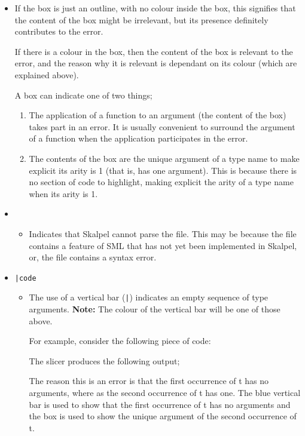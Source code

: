 \documentclass{report}
\begin{document}
\begin{itemize}
\item \texttt{}

\subitem If the box is just an outline, with no colour inside the box,
  this signifies that the content of the box might be irrelevant, but its
  presence definitely contributes to the error.

\subitem If there is a colour in the box, then the
  content of the box is relevant to the error, and the reason why it
  is relevant is dependant on its colour (which are explained above).

\subitem A box can indicate one of two things;

\begin{enumerate}
\item The application of a
  function to an argument (the content of the box) takes part in an
  error. It is usually convenient to surround the argument of a
  function when the application participates in the error.
\item The contents of the box are the unique argument of a type name
  to make explicit its arity is 1 (that is, has one argument). This is
  because there is no section of code to highlight, making explicit the
  arity of a type name when its arity is 1.
\end{enumerate}

\item \texttt{}

\begin{itemize}
\item Indicates that Skalpel cannot parse the file. This
  may be because the file contains a feature of SML that has not yet
  been implemented in Skalpel, or, the file contains a
  syntax error.
\end{itemize}

\item \texttt{|\hspace{-0.03in}code}

\begin{itemize}
\item The use of a vertical bar (\texttt{|}) indicates an empty sequence of type
  arguments. \textbf{Note:} The colour of the vertical bar will be one of those
  above.

  For example, consider the following piece of code:


  The slicer produces the following output;


  The reason this is an error is that the first occurrence of t has no
  arguments, where as the second occurrence of t has one. The blue
  vertical bar is used to show that the first occurrence of t has no arguments
  and the \tesEndPointOne box is used to show the unique argument of the second
  occurrence of t.
\end{itemize}

\end{itemize}
\end{document}
